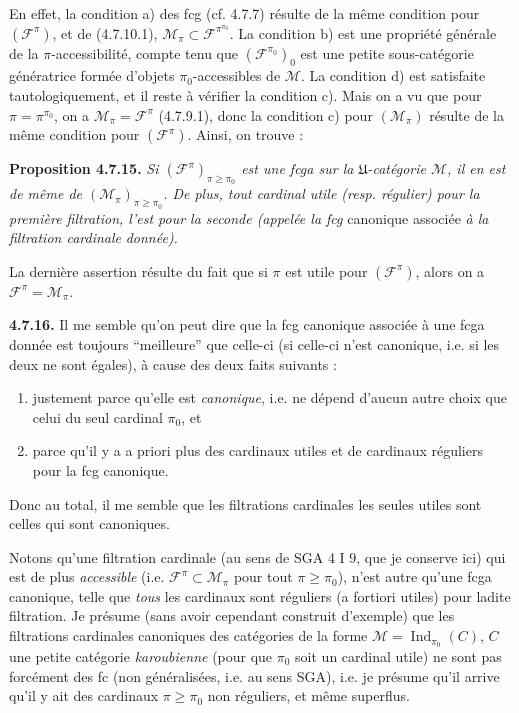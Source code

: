 \documentclass[11pt]{article}
\newcommand{\printedpage}[1]{\marginpar{\footnotesize p.~#1}}
\newcommand{\msp}[1]{\marginpar{\footnotesize [#1]}}
\newcommand{\Ind}{\operatorname{Ind}}
\begin{document}
\noindent\msp{page 180}En effet, la condition a) des fcg (cf. 4.7.7) résulte de la même condition pour $(\mathcal{F}^{\pi})$, et de (4.7.10.1), $\mathcal{M}_\pi\subset\mathcal{F}^{\pi^{\pi_0}}$. La condition b) est une propriété générale de la $\pi$-accessibilité, compte tenu que $(\mathcal{F}^{\pi_0})_0$ est une petite sous-catégorie génératrice formée d'objets $\pi_0$-accessibles de $\mathcal{M}$. La condition d) est satisfaite tautologiquement, et il reste à vérifier la condition c). Mais on a vu que pour $\pi=\pi^{\pi_0}$, on a $\mathcal{M}_\pi=\mathcal{F}^{\pi}$ (4.7.9.1), donc la condition c) pour $(\mathcal{M}_\pi)$ résulte de la même condition pour $(\mathcal{F}^{\pi})$. Ainsi, on trouve :

\textbf{Proposition 4.7.15.} \textit{Si $(\mathcal{F}^{\pi})_{\pi\geqslant\pi_0}$ est une fcga sur la $\mathfrak{U}$-catégorie $\mathcal{M}$, il en est de même de $(\mathcal{M}_\pi)_{\pi\geqslant\pi_0}$. De plus, tout cardinal utile (resp. régulier) pour la première filtration, l'est pour la seconde (appelée la fcg} canonique associée \textit{à la filtration cardinale} \textit{donnée).}

La dernière assertion résulte du fait que si $\pi$ est utile pour $(\mathcal{F}^{\pi})$, alors on a $\mathcal{F}^{\pi}=\mathcal{M}_\pi$.

\textbf{4.7.16.} Il me semble qu'on peut dire que la fcg canonique associée à une fcga donnée
\msp{page 181}
est toujours ``meilleure'' que celle-ci (si celle-ci n'est canonique, i.e. si les deux ne sont égales), à cause des deux faits suivants :
\begin{enumerate}[label=\alph*)]
\item justement parce qu'elle est \textit{canonique}, i.e. ne dépend d'aucun autre choix que celui du seul cardinal $\pi_0$, et
\item parce qu'il y a a priori plus des cardinaux utiles et de cardinaux réguliers pour la fcg canonique.
\end{enumerate}
Donc au total, il me semble que les filtrations cardinales les seules utiles sont celles qui sont canoniques.

\noindent\printedpage{62}
Notons qu'une filtration cardinale (au sens de SGA 4 I 9, que je conserve ici) qui est de plus \textit{accessible} (i.e. $\mathcal{F}^{\pi}\subset\mathcal{M}_\pi$ pour tout $\pi\geqslant\pi_0$), n'est autre qu'une fcga canonique, telle que \textit{tous} les cardinaux sont réguliers (a fortiori utiles) pour ladite filtration. Je présume (sans avoir cependant construit d'exemple) que les filtrations cardinales canoniques des catégories de la forme $\mathcal{M}=\Ind_{\pi_0}(C)$, $C$ une petite catégorie \textit{karoubienne} (pour que $\pi_0$ soit un cardinal utile) ne sont pas forcément des fc (non généralisées, i.e. au sens SGA), i.e. je présume qu'il arrive qu'il y ait des cardinaux $\pi\geqslant\pi_0$ non réguliers, et même superflus.
\end{document}
